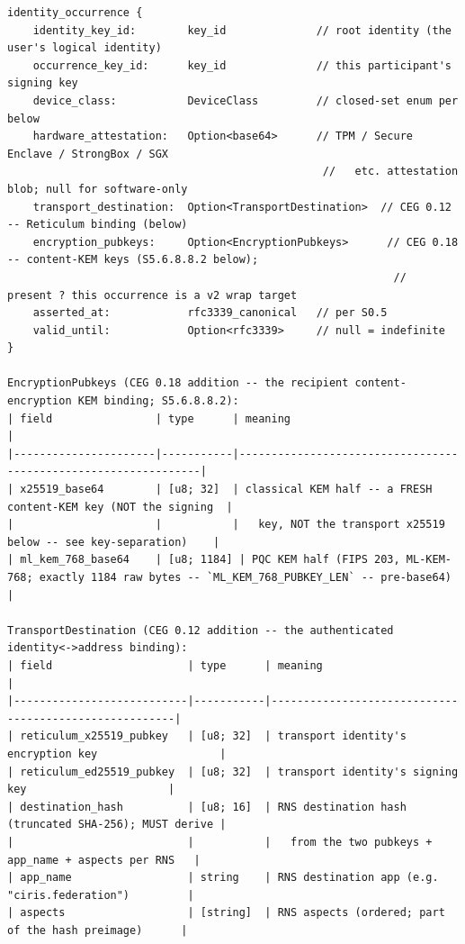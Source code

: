 \documentclass[10pt]{article}
\begin{document}
\begin{lstlisting}
identity_occurrence {
    identity_key_id:        key_id              // root identity (the user's logical identity)
    occurrence_key_id:      key_id              // this participant's signing key
    device_class:           DeviceClass         // closed-set enum per below
    hardware_attestation:   Option<base64>      // TPM / Secure Enclave / StrongBox / SGX
                                                 //   etc. attestation blob; null for software-only
    transport_destination:  Option<TransportDestination>  // CEG 0.12 -- Reticulum binding (below)
    encryption_pubkeys:     Option<EncryptionPubkeys>      // CEG 0.18 -- content-KEM keys (S5.6.8.8.2 below);
                                                            //   present ? this occurrence is a v2 wrap target
    asserted_at:            rfc3339_canonical   // per S0.5
    valid_until:            Option<rfc3339>     // null = indefinite
}

EncryptionPubkeys (CEG 0.18 addition -- the recipient content-encryption KEM binding; S5.6.8.8.2):
| field                | type      | meaning                                                        |
|----------------------|-----------|----------------------------------------------------------------|
| x25519_base64        | [u8; 32]  | classical KEM half -- a FRESH content-KEM key (NOT the signing  |
|                      |           |   key, NOT the transport x25519 below -- see key-separation)    |
| ml_kem_768_base64    | [u8; 1184] | PQC KEM half (FIPS 203, ML-KEM-768; exactly 1184 raw bytes -- `ML_KEM_768_PUBKEY_LEN` -- pre-base64) |

TransportDestination (CEG 0.12 addition -- the authenticated identity<->address binding):
| field                     | type      | meaning                                               |
|---------------------------|-----------|-------------------------------------------------------|
| reticulum_x25519_pubkey   | [u8; 32]  | transport identity's encryption key                   |
| reticulum_ed25519_pubkey  | [u8; 32]  | transport identity's signing key                      |
| destination_hash          | [u8; 16]  | RNS destination hash (truncated SHA-256); MUST derive |
|                           |           |   from the two pubkeys + app_name + aspects per RNS   |
| app_name                  | string    | RNS destination app (e.g. "ciris.federation")         |
| aspects                   | [string]  | RNS aspects (ordered; part of the hash preimage)      |


\end{lstlisting}
\end{document}
